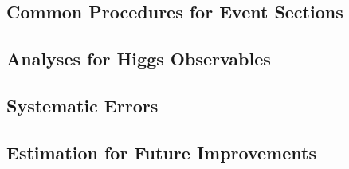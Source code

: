 


\subsection{Common Procedures for Event Sections}

\label{subsec:higgs_common}

\subsection{Analyses for Higgs Observables}


% 

% 

\subsection{Systematic Errors}



\subsection{Estimation for Future Improvements}


